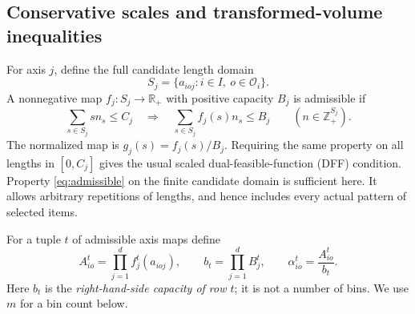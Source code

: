 \subsection{Conservative scales and transformed-volume inequalities}
\label{subsec:scales}
For axis $j$, define the full candidate length domain
\begin{equation}
 S_j=\{a_{ioj}:i\in I,\ o\in\mathcal O_i\}.
\end{equation}
A nonnegative map $f_j:S_j\to\mathbb R_+$ with positive capacity $B_j$
is admissible if
\begin{equation}
 \sum_{s\in S_j}s n_s\leq C_j
 \quad\Longrightarrow\quad
 \sum_{s\in S_j} f_j(s)n_s\leq B_j
 \qquad(n\in\mathbb Z_+^{S_j}).                    \label{eq:admissible}
\end{equation}
The normalized map is $g_j(s)=f_j(s)/B_j$. Requiring the same property
on all lengths in $[0,C_j]$ gives the usual scaled dual-feasible-function
(DFF) condition. Property \eqref{eq:admissible} on the finite candidate
domain is sufficient here. It allows arbitrary repetitions of lengths,
and hence includes every actual pattern of selected items.

For a tuple $t$ of admissible axis maps define
\begin{equation}
 A^t_{io}=\prod_{j=1}^d f^t_j(a_{ioj}),\qquad
 b_t=\prod_{j=1}^d B^t_j,\qquad
 \alpha^t_{io}=\frac{A^t_{io}}{b_t}.
                                                               \label{eq:coefficients}
\end{equation}
Here $b_t$ is the \emph{right-hand-side capacity of row $t$}; it is not
a number of bins. We use $m$ for a bin count below.

